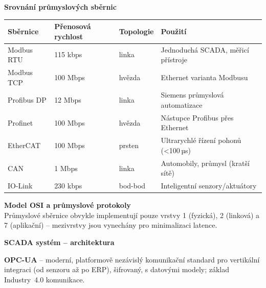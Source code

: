\documentclass[a4paper,10pt]{article}
\begin{document}
\begin{vysvetlenibox}
\textbf{Srovnání průmyslových sběrnic}

\begin{center}
\begin{tabularx}{0.95\linewidth}{@{} l l l X @{}}
    \toprule
    \textbf{Sběrnice} & \textbf{Přenosová rychlost}
                      & \textbf{Topologie} & \textbf{Použití} \\
    \midrule
    Modbus RTU  & 115 kbps   & linka     & Jednoduchá SCADA, měřicí přístroje \\
    Modbus TCP  & 100 Mbps   & hvězda    & Ethernet varianta Modbusu \\
    Profibus DP & 12 Mbps    & linka     & Siemens průmyslová automatizace \\
    Profinet    & 100 Mbps   & hvězda    & Nástupce Profibus přes Ethernet \\
    EtherCAT    & 100 Mbps   & prsten    & Ultrarychlé řízení pohonů (\textless{}100\,µs) \\
    CAN         & 1 Mbps     & linka     & Automobily, průmysl (kratší sítě) \\
    IO-Link     & 230 kbps   & bod-bod   & Inteligentní senzory/aktuátory \\
    \bottomrule
\end{tabularx}
\end{center}

\textbf{Model OSI a průmyslové protokoly}\\
Průmyslové sběrnice obvykle implementují pouze vrstvy 1 (fyzická),
2 (linková) a 7 (aplikační) -- mezivrstvy jsou vynechány pro minimalizaci
latence.

\textbf{SCADA systém -- architektura}

\begin{center}
\end{center}

\textbf{OPC-UA} -- moderní, platformově nezávislý komunikační standard
pro vertikální integraci (od senzoru až po ERP), šifrovaný, s datovými
modely; základ Industry~4.0 komunikace.
\end{vysvetlenibox}
\end{document}
